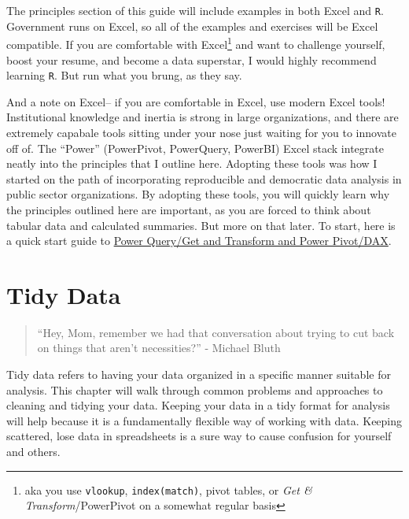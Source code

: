 \documentclass[]{book}
\begin{document}
The principles section of this guide will include examples in both Excel and \texttt{R}. Government runs on Excel, so all of the examples and exercises will be Excel compatible. If you are comfortable with Excel\footnote{aka you use \texttt{vlookup}, \texttt{index(match)}, pivot tables, or \emph{Get \& Transform}/PowerPivot on a somewhat regular basis} and want to challenge yourself, boost your resume, and become a data superstar, I would highly recommend learning \texttt{R}. But run what you brung, as they say.

And a note on Excel-- if you are comfortable in Excel, use modern Excel tools! Institutional knowledge and inertia is strong in large organizations, and there are extremely capabale tools sitting under your nose just waiting for you to innovate off of. The ``Power'' (PowerPivot, PowerQuery, PowerBI) Excel stack integrate neatly into the principles that I outline here. Adopting these tools was how I started on the path of incorporating reproducible and democratic data analysis in public sector organizations. By adopting these tools, you will quickly learn why the principles outlined here are important, as you are forced to think about tabular data and calculated summaries. But more on that later. To start, here is a quick start guide to \href{https://support.office.com/en-us/article/get-started-with-power-pivot-in-microsoft-excel-fdfcf944-7876-424a-8437-1a6c1043a80b}{Power Query/Get and Transform and Power Pivot/DAX}.

\hypertarget{tidy-data}{%
\chapter{Tidy Data}\label{tidy-data}}

\begin{quote}
``Hey, Mom, remember we had that conversation about trying to cut back on things that aren't necessities?'' - Michael Bluth
\end{quote}

Tidy data refers to having your data organized in a specific manner suitable for analysis. This chapter will walk through common problems and approaches to cleaning and tidying your data. Keeping your data in a tidy format for analysis will help because it is a fundamentally flexible way of working with data. Keeping scattered, lose data in spreadsheets is a sure way to cause confusion for yourself and others.
\end{document}
